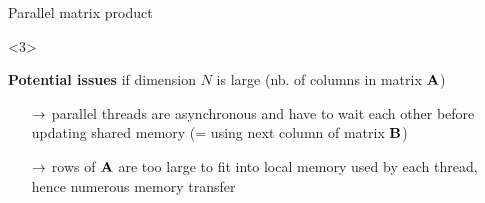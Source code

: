 \documentclass[14pt]{beamer}
\begin{document}
\begin{frame}{Parallel matrix product}
\begin{onlyenv}<3>

\textbf{Potential issues} if dimension $N$ is large {\small (nb. of columns in matrix $\mathbf{A}$)}

\begin{itemize}
\setitsep{1em}
\item[$\rightarrow$] parallel threads are asynchronous and have to wait each other before updating shared memory (= using next column of matrix $\mathbf{B}$)
\item[$\rightarrow$] rows of $\mathbf{A}$ are too large to fit into local memory used by each thread, hence numerous memory transfer
\end{itemize}

\end{onlyenv}
\end{frame}
\end{document}
